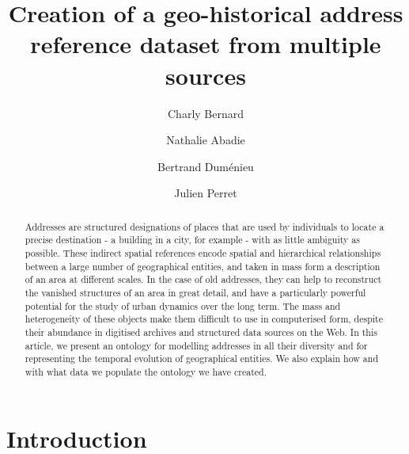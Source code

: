 \documentclass[runningheads]{llncs}
\begin{document}
\title{Creation of a geo-historical address reference dataset from multiple sources}
%
%
\author{Charly Bernard \and
Nathalie Abadie \and
Bertrand Duménieu\and
Julien Perret}
%
%
%
\maketitle              %
%
\begin{abstract}
Addresses are structured designations of places that are used by individuals to locate a precise destination - a building in a city, for example - with as little ambiguity as possible. These indirect spatial references encode spatial and hierarchical relationships between a large number of geographical entities, and taken in mass form a description of an area at different scales. In the case of old addresses, they can help to reconstruct the vanished structures of an area in great detail, and have a particularly powerful potential for the study of urban dynamics over the long term. The mass and heterogeneity of these objects make them difficult to use in computerised form, despite their abundance in digitised archives and structured data sources on the Web. In this article, we present an ontology for modelling addresses in all their diversity and for representing the temporal evolution of geographical entities. We also explain how and with what data we populate the ontology we have created.
\end{abstract}

%
\section{Introduction}
\label{sect:intro}

\end{document}
